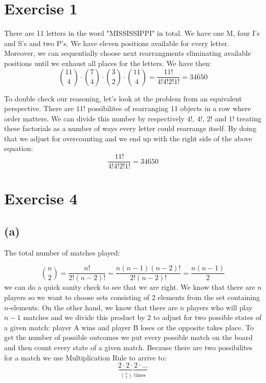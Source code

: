 \documentclass{article}
\begin{document}
\section*{Exercise 1}

There are 11 letters in the word "MISSISSIPPI" in total. We have one M, four I's and S's and two P's. We have
eleven positions available for every letter. Moreover, we can sequentially
choose next rearrangments eliminating available positions until we exhaust all places for the letters. We have then:
\begin{equation*}
    \binom{11}{4} \cdot \binom{7}{4} \cdot \binom{3}{2} \cdot \binom{11}{4} = \frac{11!}{4! 4! 2! 1!} = 34650
\end{equation*}

To double check our reasoning, let's look at the problem from an equivalent perspective. There are \(11!\) possibilites
of rearranging 11 objects in a row where order matters. We can divide this number by respectively \(4!\), \(4!\), \(2!\) and \(1!\)
treating these factorials as a number of ways every letter could rearrange itself. By doing that we adjust for overcounting
and we end up with the right side of the above equation:
\begin{equation*}
    \frac{11!}{4! 4! 2! 1!} = 34650
\end{equation*}

\section*{Exercise 4}
\subsection*{(a)}
The total number of matches played:

\begin{equation*}
    \binom{n}{2} = \frac{n!}{2!(n - 2)!} = \frac{n(n-1)(n-2)!}{2!(n-2)!} = \frac{n(n-1)}{2}
\end{equation*}
we can do a quick sanity check to see that we are right. We know that there are \(n\) players so we want to choose
sets consisting of 2 elements from the set containing \(n\)-elements. On the other hand, we know that there are
\(n\) players who will play \(n-1\) matches and we divide this product by \(2\) to adjust for two possible
states of a given match: player A wins and player B loses or the opposite takes place.
To get the number of possible outcomes we put every possible match on the board and then count every state of 
a given match. Because there are two possibilites for a match we use Multiplication Rule to arrive to:
\begin{equation*}
    \underbrace{2 \cdot 2 \cdot 2 \cdot \dots }_\text{\(\binom{n}{2}\) times}
\end{equation*} 
\end{document}
